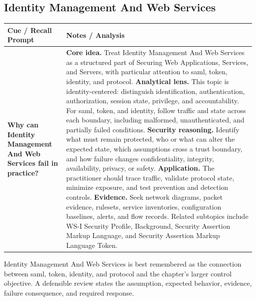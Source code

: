 \documentclass[11pt]{article}
\newcommand{\CornellHeader}{%
\rowcolor{Navy}\color{white}\bfseries Cue / Recall Prompt & \color{white}\bfseries Notes / Analysis\\\hline}
\newcommand{\CornellRow}[2]{%
\cellcolor{CueGray}\RaggedRight\textbf{#1} & \RaggedRight #2\\\hline}
\begin{document}
\subsection*{Identity Management And Web Services}
\begin{longtable}{>{\RaggedRight\arraybackslash}p{}|>{\RaggedRight\arraybackslash}p{}}
\CornellHeader
\CornellRow{Why can Identity Management And Web Services fail in practice?}{\textbf{Core idea.} Treat Identity Management And Web Services as a structured part of Securing Web Applications, Services, and Servers, with particular attention to saml, token, identity, and protocol. \textbf{Analytical lens.} This topic is identity-centered: distinguish identification, authentication, authorization, session state, privilege, and accountability. For saml, token, and identity, follow traffic and state across each boundary, including malformed, unauthenticated, and partially failed conditions. \textbf{Security reasoning.} Identify what must remain protected, who or what can alter the expected state, which assumptions cross a trust boundary, and how failure changes confidentiality, integrity, availability, privacy, or safety. \textbf{Application.} The practitioner should trace traffic, validate protocol state, minimize exposure, and test prevention and detection controls. \textbf{Evidence.} Seek network diagrams, packet evidence, rulesets, service inventories, configuration baselines, alerts, and flow records. Related subtopics include WS-I Security Profile, Background, Security Assertion Markup Language, and Security Assertion Markup Language Token.}
\end{longtable}
\begin{topicsummary}
Identity Management And Web Services is best remembered as the connection between saml, token, identity, and protocol and the chapter's larger control objective. A defensible review states the assumption, expected behavior, evidence, failure consequence, and required response.
\end{topicsummary}
\end{document}
